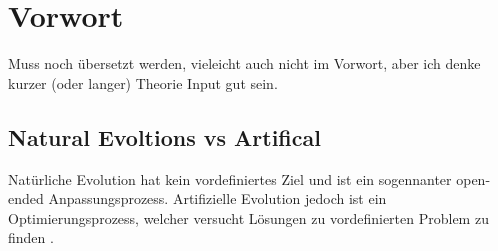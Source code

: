 %
%


\chapter{Vorwort}
  Muss noch übersetzt werden, vieleicht auch nicht im Vorwort, aber ich denke kurzer (oder langer) Theorie Input gut sein.

  \section{Natural Evoltions vs Artifical}
    Natürliche Evolution hat kein vordefiniertes Ziel und ist ein sogennanter \grqq{} open-ended \grqq{} Anpassungsprozess. Artifizielle Evolution jedoch ist ein Optimierungsprozess, welcher versucht Lösungen zu vordefinierten Problem zu finden \cite[S.1]{book:bioInspired}. \\

